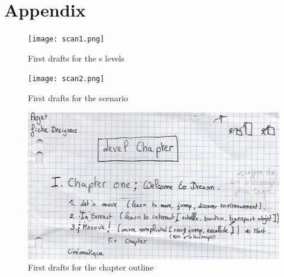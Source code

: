 \chapter*{Appendix}
	\begin{figure}
		\texttt{[image: scan1.png]}
		\caption{First drafts for the s levels}
	\end{figure}
	\begin{figure}
		\texttt{[image: scan2.png]}
		\caption{First drafts for the scenario}
	\end{figure}
	\begin{figure}
		\includegraphics{scan3.png}
		\caption{First drafts for the chapter outline}
	\end{figure}
